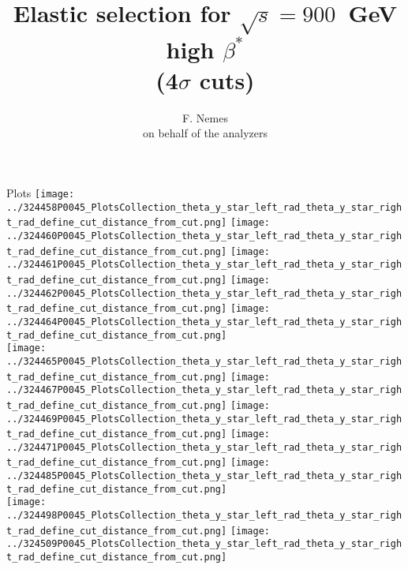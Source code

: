 \documentclass{beamer}
\title[TOTEM Physics Analysis meeting, 900 GeV high-$\beta^{*}$ for CNI analysis]{\scriptsize Elastic selection for $\sqrt{s}=900$~GeV high $\beta^{*}$\\ (4$\sigma$ cuts)}
\author{F. Nemes\\\vspace{1mm} \tiny on behalf of the analyzers}
\begin{document}
\begin{frame}
        \titlepage
\end{frame}

\begin{frame}\tiny
        \begin{block}{Plots}
		  \centering
                \texttt{[image: ../324458P0045\_PlotsCollection\_theta\_y\_star\_left\_rad\_theta\_y\_star\_right\_rad\_define\_cut\_distance\_from\_cut.png]}
                \texttt{[image: ../324460P0045\_PlotsCollection\_theta\_y\_star\_left\_rad\_theta\_y\_star\_right\_rad\_define\_cut\_distance\_from\_cut.png]}
                \texttt{[image: ../324461P0045\_PlotsCollection\_theta\_y\_star\_left\_rad\_theta\_y\_star\_right\_rad\_define\_cut\_distance\_from\_cut.png]}
                \texttt{[image: ../324462P0045\_PlotsCollection\_theta\_y\_star\_left\_rad\_theta\_y\_star\_right\_rad\_define\_cut\_distance\_from\_cut.png]}
                \texttt{[image: ../324464P0045\_PlotsCollection\_theta\_y\_star\_left\_rad\_theta\_y\_star\_right\_rad\_define\_cut\_distance\_from\_cut.png]}\\
                \texttt{[image: ../324465P0045\_PlotsCollection\_theta\_y\_star\_left\_rad\_theta\_y\_star\_right\_rad\_define\_cut\_distance\_from\_cut.png]}
                \texttt{[image: ../324467P0045\_PlotsCollection\_theta\_y\_star\_left\_rad\_theta\_y\_star\_right\_rad\_define\_cut\_distance\_from\_cut.png]}
                \texttt{[image: ../324469P0045\_PlotsCollection\_theta\_y\_star\_left\_rad\_theta\_y\_star\_right\_rad\_define\_cut\_distance\_from\_cut.png]}
                \texttt{[image: ../324471P0045\_PlotsCollection\_theta\_y\_star\_left\_rad\_theta\_y\_star\_right\_rad\_define\_cut\_distance\_from\_cut.png]}
                \texttt{[image: ../324485P0045\_PlotsCollection\_theta\_y\_star\_left\_rad\_theta\_y\_star\_right\_rad\_define\_cut\_distance\_from\_cut.png]}\\
                \texttt{[image: ../324498P0045\_PlotsCollection\_theta\_y\_star\_left\_rad\_theta\_y\_star\_right\_rad\_define\_cut\_distance\_from\_cut.png]}
                \texttt{[image: ../324509P0045\_PlotsCollection\_theta\_y\_star\_left\_rad\_theta\_y\_star\_right\_rad\_define\_cut\_distance\_from\_cut.png]}

\end{block}
\end{frame}
\end{document}
